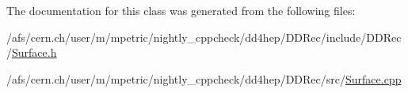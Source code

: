 The documentation for this class was generated from the following files:\begin{DoxyCompactItemize}
\item 
/afs/cern.ch/user/m/mpetric/nightly\_\-cppcheck/dd4hep/DDRec/include/DDRec/\hyperlink{_surface_8h}{Surface.h}\item 
/afs/cern.ch/user/m/mpetric/nightly\_\-cppcheck/dd4hep/DDRec/src/\hyperlink{_surface_8cpp}{Surface.cpp}\end{DoxyCompactItemize}
